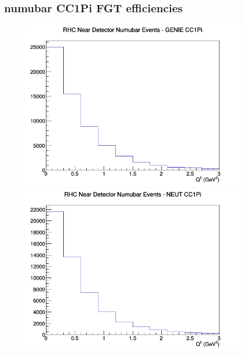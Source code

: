 \subsection{numubar CC1Pi FGT efficiencies}
\begin{figure}[h]
\includegraphics[width=\linewidth]{eff_Q2/FGT/CC1Pi_RHC_ND_numubar_Q2_GENIE.png}
\endminipage
{}
\includegraphics[width=\linewidth]{eff_Q2/FGT/CC1Pi_RHC_ND_numubar_Q2_NEUT.png}
\endminipage
{}

\end{figure}
